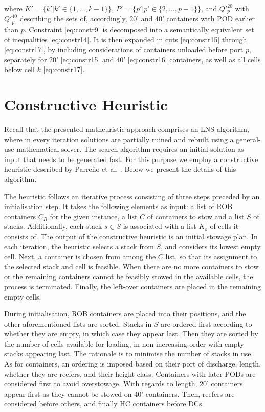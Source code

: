 \documentclass[preprint,11pt,3p]{elsarticle}
\begin{document}
where $K' = \{k'|k' \in \{1, \ldots, k-1\}\}$, $P' = \{p'|p' \in \{2, \ldots, p-1\}\}$, and $Q'^{20}_{p}$ with $Q'^{40}_{p}$ describing the sets of, accordingly, 20' and 40' containers with POD earlier than $p$. Constraint \eqref{eq:constr9} is decomposed into a semantically equivalent set of inequalities \eqref{eq:constr14}. It is then expanded in cuts \eqref{eq:constr15} through \eqref{eq:constr17}, by including considerations of containers unloaded before port $p$, separately for 20' \eqref{eq:constr15} and 40' \eqref{eq:constr16} containers, as well as all cells below cell $k$ \eqref{eq:constr17}. \cite{DJJRA12}

\section{Constructive Heuristic}
\label{sec:ConstHeuristic}
Recall that the presented matheuristic approach comprises an LNS algorithm, where in every iteration solutions are partially ruined and rebuilt using a general-use mathematical solver. The search algorithm requires an initial solution as input that needs to be generated fast. For this purpose we employ a constructive heuristic described by Parre\~{n}o et al. \cite{PPAV16}. Below we present the details of this algorithm.

The heuristic follows an iterative process consisting of three steps preceded by an initialisation step. It takes the following elements as input: a list of ROB containers $C_R$ for the given instance, a list $C$ of containers to stow and a list $S$ of stacks. Additionally, each stack $s \in S$ is associated with a list $K_s$ of cells it consists of. The output of the constructive heuristic is an initial stowage plan. In each iteration, the heuristic selects a stack from $S$, and considers its lowest empty cell. Next, a container is chosen from among the $C$ list, so that its assignment to the selected stack and cell is feasible. When there are no more containers to stow or the remaining containers cannot be feasibly stowed in the available cells, the process is terminated. Finally, the left-over containers are placed in the remaining empty cells.

During initialisation, ROB containers are placed into their positions, and the other aforementioned lists are sorted. Stacks in $S$ are ordered first according to whether they are empty, in which case they appear last. Then they are sorted by the number of cells available for loading, in non-increasing order with empty stacks appearing last. The rationale is to minimise the number of stacks in use. 
As for containers, an ordering is imposed based on their port of discharge, length, whether they are reefers, and their height class. Containers with later PODs are considered first to avoid overstowage. With regards to length, 20' containers appear first as they cannot be stowed on 40' containers. Then, reefers are considered before others, and finally HC containers before DCs.   
\end{document}
